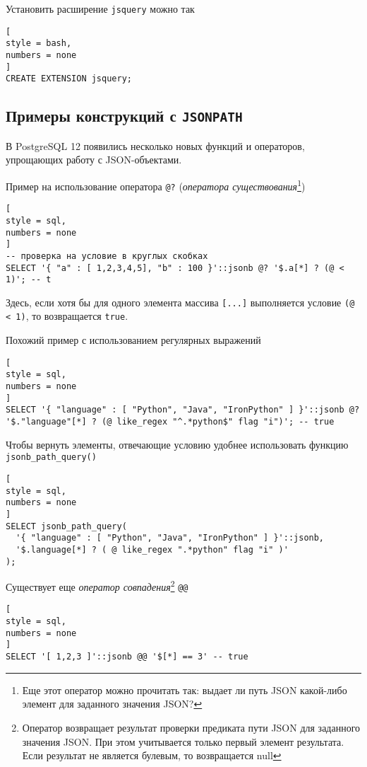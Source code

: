 \documentclass[%
	11pt,
	a4paper,
	utf8,
		]{article}
\begin{document}
Установить расширение \texttt{jsquery} можно так
\begin{lstlisting}[
style = bash,
numbers = none
]
CREATE EXTENSION jsquery;
\end{lstlisting}
 


\subsection{Примеры конструкций с \texttt{JSONPATH}}

В PostgreSQL 12 появились несколько новых функций и операторов, упрощающих работу с JSON-объектами.

Пример на использование оператора \verb|@?| (\emph{оператора существования}\footnote{Еще этот оператор можно прочитать так: выдает ли путь JSON какой-либо элемент для заданного значения JSON?})
\begin{lstlisting}[
style = sql, 
numbers = none
]
-- проверка на условие в круглых скобках
SELECT '{ "a" : [ 1,2,3,4,5], "b" : 100 }'::jsonb @? '$.a[*] ? (@ < 1)'; -- t
\end{lstlisting}

Здесь, если хотя бы для одного элемента массива \verb|[...]| выполняется условие \verb|(@ < 1)|, то возвращается \texttt{true}.

Похожий пример с использованием регулярных выражений
\begin{lstlisting}[
style = sql, 
numbers = none
]
SELECT '{ "language" : [ "Python", "Java", "IronPython" ] }'::jsonb @? '$."language"[*] ? (@ like_regex "^.*python$" flag "i")'; -- true
\end{lstlisting}

Чтобы вернуть элементы, отвечающие условию удобнее использовать функцию \verb|jsonb_path_query()|
\begin{lstlisting}[
style = sql, 
numbers = none
]
SELECT jsonb_path_query(
  '{ "language" : [ "Python", "Java", "IronPython" ] }'::jsonb,
  '$.language[*] ? ( @ like_regex ".*python" flag "i" )'
);
\end{lstlisting}

Существует еще \emph{оператор совпадения}\footnote{Оператор возвращает результат проверки предиката пути JSON для заданного значения JSON. При этом учитывается только первый элемент результата. Если результат не является булевым, то возвращается null} \verb|@@|
\begin{lstlisting}[
style = sql, 
numbers = none
]
SELECT '[ 1,2,3 ]'::jsonb @@ '$[*] == 3' -- true
\end{lstlisting}
\end{document}

